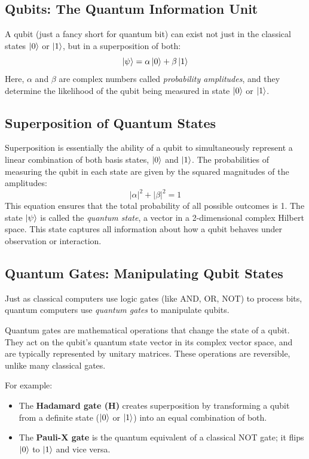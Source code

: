 \documentclass{article}
\begin{document}
\subsection{Qubits: The Quantum Information Unit}
A qubit (just a fancy short for quantum bit) can exist not just in the classical states $\ket{0}$ or $\ket{1}$, but in a superposition of both:
\[
    \ket{\psi} = \alpha \ket{0} + \beta \ket{1}
\]
Here, $\alpha$ and $\beta$ are complex numbers called \emph{probability amplitudes}, and they determine the likelihood of the qubit being measured in state $\ket{0}$ or $\ket{1}$.

\subsection{Superposition of Quantum States}
Superposition is essentially the ability of a qubit to simultaneously represent a linear combination of both basis states, $\ket{0}$ and $\ket{1}$. The probabilities of measuring the qubit in each state are given by the squared magnitudes of the amplitudes:
\[
    |\alpha|^2 + |\beta|^2 = 1
\]
This equation ensures that the total probability of all possible outcomes is 1. The state $\ket{\psi}$ is called the \emph{quantum state}, a vector in a 2-dimensional complex Hilbert space. This state captures all information about how a qubit behaves under observation or interaction.

\subsection{Quantum Gates: Manipulating Qubit States}
Just as classical computers use logic gates (like AND, OR, NOT) to process bits, quantum computers use \emph{quantum gates} to manipulate qubits.

Quantum gates are mathematical operations that change the state of a qubit. They act on the qubit's quantum state vector in its complex vector space, and are typically represented by unitary matrices. These operations are reversible, unlike many classical gates.

For example:
\begin{itemize}
    \item The \textbf{Hadamard gate (H)} creates superposition by transforming a qubit from a definite state ($\ket{0}$ or $\ket{1}$) into an equal combination of both.
    \item The \textbf{Pauli-X gate} is the quantum equivalent of a classical NOT gate; it flips $\ket{0}$ to $\ket{1}$ and vice versa.
\end{itemize}
\end{document}
